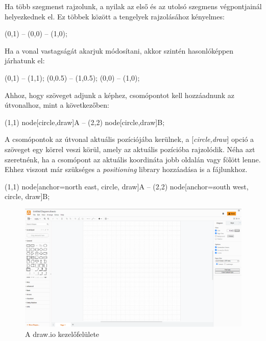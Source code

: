 \noindent
Ha több szegmenst rajzolunk, a nyilak az első és az utolsó szegmens végpontjainál helyezkednek el. Ez többek között a tengelyek rajzolásához kényelmes:

\begin{tikzcode}
\draw [<->] (0,1) -- (0,0) -- (1,0);
\end{tikzcode}

\noindent
Ha a vonal vastagságát akarjuk módosítani, akkor szintén hasonlóképpen járhatunk el:

\begin{tikzcode}
\draw [thin] (0,1) -- (1,1);
\draw [thick] (0,0.5) -- (1,0.5);	
 (0,0) -- (1,0);
\end{tikzcode}


\noindent
Ahhoz, hogy szöveget adjunk a képhez, csomópontot kell hozzáadnunk az útvonalhoz, mint a következőben:

\begin{tikzcode}
\draw 
	(1,1) node[circle,draw]{A} 
	-- 
	(2,2) node[circle,draw]{B};	
\end{tikzcode}

\noindent
A csomópontok az útvonal aktuális pozíciójába kerülnek, a [\textit{circle,draw}] opció a szöveget egy körrel veszi körül, amely az aktuális pozícióba rajzolódik.
Néha azt szeretnénk, ha a csomópont az aktuális koordináta jobb oldalán vagy fölött lenne. Ehhez viszont már szükséges a \textit{positioning} library hozzáadása is a fájlunkhoz.

\begin{tikzcode}
\draw 
(1,1) node[anchor=north east, circle, draw]{A} 
	-- 
(2,2) node[anchor=south west, circle, draw]{B}; 
\end{tikzcode}







\begin{figure}[!h]
	\includegraphics[width=\textwidth]{images/drawio.png}
	\caption{A draw.io kezelőfelülete \cite{drawio}}
\label{fig:drawio}
\end{figure}

